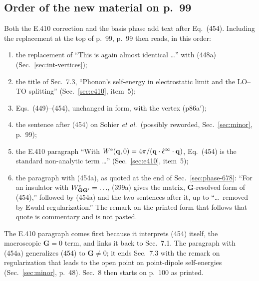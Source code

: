 \documentclass[11pt]{article}
\begin{document}
\subsection{Order of the new material on p.~99}\label{sec:int-p99}
Both the E.410 correction and the basis phase add text after Eq.~(454). Including the replacement at the
top of p.~99, p.~99 then reads, in this order:
\begin{enumerate}
\item the replacement of ``This is again almost identical \ldots'' with (448a)
(Sec.~\ref{sec:int-vertices});
\item the title of Sec.~7.3, ``Phonon's self-energy in electrostatic limit and the LO--TO splitting''
(Sec.~\ref{sec:e410}, item~5);
\item Eqs.~(449)--(454), unchanged in form, with the vertex (p86a$'$);
\item the sentence after (454) on Sohier \textit{et al.}\ (possibly reworded, Sec.~\ref{sec:minor}, p.~99);
\item the E.410 paragraph ``With $W^{\rm e}(\mathbf q,0)=4\pi/(\mathbf q\cdot\hat\epsilon^\infty\cdot\mathbf q)$,
Eq.~(454) is the standard non-analytic term \ldots'' (Sec.~\ref{sec:e410}, item~5);
\item the paragraph with (454a), as quoted at the end of Sec.~\ref{sec:phase-678}: ``For an insulator
with $W^{\rm e}_{\mathbf G\mathbf G'}=\ldots$, (399a) gives the matrix, $\mathbf G$-resolved form of (454),''
followed by (454a) and the two sentences after it, up to ``\ldots\ removed by Ewald regularization.''
The remark on the printed form that follows that quote is commentary and is not pasted.
\end{enumerate}
The E.410 paragraph comes first because it interprets (454) itself, the macroscopic $\mathbf G=0$ term,
and links it back to Sec.~7.1. The paragraph with (454a) generalizes (454) to $\mathbf G\neq0$; it ends
Sec.~7.3 with the remark on regularization that leads to the open point on point-dipole self-energies
(Sec.~\ref{sec:minor}, p.~48). Sec.~8 then starts on p.~100 as printed.
\end{document}
